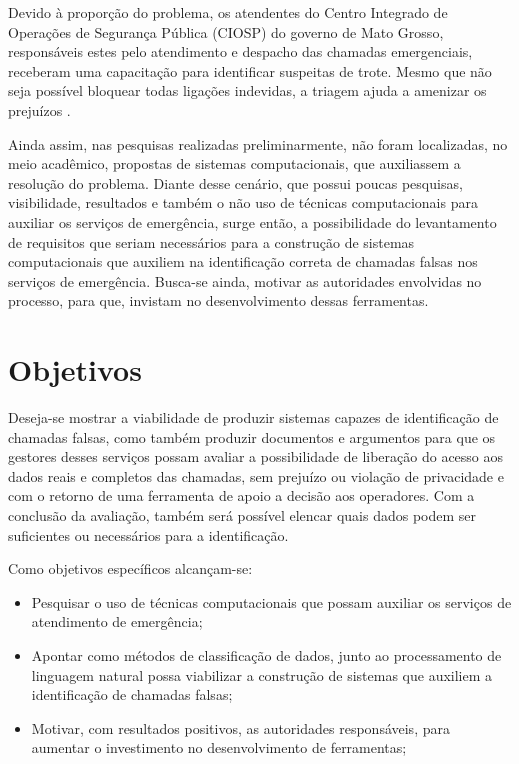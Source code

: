 Devido à proporção do problema, os atendentes do Centro Integrado de Operações de Segurança Pública (CIOSP) do governo de Mato Grosso, responsáveis estes pelo atendimento e despacho das chamadas emergenciais, receberam uma capacitação para identificar suspeitas de trote. Mesmo que não seja possível bloquear todas ligações indevidas, a triagem ajuda a amenizar os prejuízos \citep{govMatoGrosso2016}. 

Ainda assim, nas pesquisas realizadas preliminarmente, não foram localizadas, no meio acadêmico, propostas de sistemas computacionais, que auxiliassem a resolução do problema. Diante desse cenário, que possui poucas pesquisas, visibilidade, resultados e também o não uso de técnicas computacionais para auxiliar os serviços de emergência, surge então, a possibilidade do levantamento de requisitos que seriam necessários para a construção de sistemas computacionais que auxiliem na identificação correta de chamadas falsas nos serviços de emergência. Busca-se ainda, motivar as autoridades envolvidas no processo, para que, invistam no desenvolvimento dessas ferramentas.

\section{Objetivos}
Deseja-se mostrar a viabilidade de produzir sistemas capazes de identificação de chamadas falsas, como também produzir documentos e argumentos para que os gestores desses serviços possam avaliar a possibilidade de liberação do acesso aos dados reais e completos das chamadas, sem prejuízo ou violação de privacidade e com o retorno de uma ferramenta de apoio a decisão aos operadores. Com a conclusão da avaliação, também será possível elencar quais dados podem ser suficientes ou necessários para a identificação.

Como objetivos específicos alcançam-se:

\begin{itemize}
    \item Pesquisar o uso de técnicas computacionais que possam auxiliar os serviços de atendimento de emergência;
    \item Apontar como métodos de classificação de dados, junto ao processamento de linguagem natural possa viabilizar a construção de sistemas que auxiliem a identificação de chamadas falsas;
    \item Motivar, com resultados positivos, as autoridades responsáveis, para aumentar o investimento no desenvolvimento de ferramentas;
\end{itemize}

